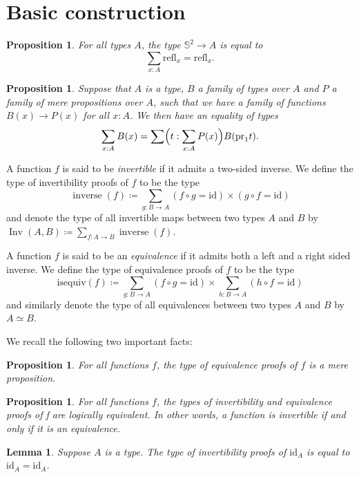 \documentclass{article}
\theoremstyle{plain}
\newtheorem{proposition}[theorem]{Proposition}
\newtheorem{lemma}[theorem]{Lemma}
\theoremstyle{definition}
\theoremstyle{remark}
\newcommand{\id}{\mathrm{id}}
\newcommand{\isequiv}{\mathrm{isequiv}}
\newcommand{\pr}{\mathrm{pr}}
\newcommand{\refl}{\mathrm{refl}}
\newcommand{\nsphere}[1]{\mathbb{S}^{#1}}
\newcommand{\sphere}{\nsphere{2}}
\DeclareMathOperator{\inv}{Inv}
\DeclareMathOperator{\inverse}{inverse}
\begin{document}
\section{Basic construction}

\begin{proposition}
  \label{universal-property-sphere}
  For all types \(A\), the type \(\sphere \to A\) is equal to
  \[\sum_{x : A} \refl_{x} = \refl_{x}.\]
\end{proposition}
\begin{proposition}
  \label{family-over-subtype}
  Suppose that \(A\) is a type, \(B\) a family of types over \(A\) and \(P\) a family of mere
  propositions over \(A\), such that we have a family of functions \(B(x) \to P(x)\) for all
  \(x : A\). We then have an equality of types
  \[\sum_{x : A}B(x) = \sum \Bigl(t : \sum_{x : A}P(x)\Bigr) B(\pr_{1}t).\]
\end{proposition}

A function \(f\) is said to be \emph{invertible}
if it admits a two-sided inverse.
We define the type of invertibility proofs of \(f\) to be the type
\[\inverse(f) \coloneq \sum_{g : B \to A}(f \circ g = \id) \times (g \circ f = \id)\]
and denote the type of all invertible maps between two types \(A\) and \(B\) by
\(\inv(A, B) \coloneq \sum_{f : A \to B}\inverse(f)\).

A function \(f\) is said to be an \emph{equivalence} if it admits both a left and a
right sided inverse.
We define the type of equivalence proofs of \(f\) to be the type
\[\isequiv(f) \coloneq \sum_{g : B \to A}(f \circ g = \id) \times
  \sum_{h : B \to A}(h \circ f = \id)\]
and similarly denote the type of all equivalences between two types \(A\) and \(B\)
by~\(A \simeq B\).


We recall the following two important facts:
\begin{proposition}
  \label{is-prop-equiv}
  For all functions \(f\), the type of equivalence proofs of \(f\) is a mere proposition.
\end{proposition}

\begin{proposition}
  \label{inv-implies-equiv}
  For all functions \(f\), the types of invertibility and equivalence proofs of f are
  logically equivalent. In other words, a function is invertible if and only if it is
  an equivalence.
\end{proposition}

\begin{lemma}
  \label{inv-id}
  Suppose \(A\) is a type. The type of invertibility proofs of \(\id_{A}\) is equal
  to \(\id_{A} = \id_{A}\).
\end{lemma}
\end{document}

